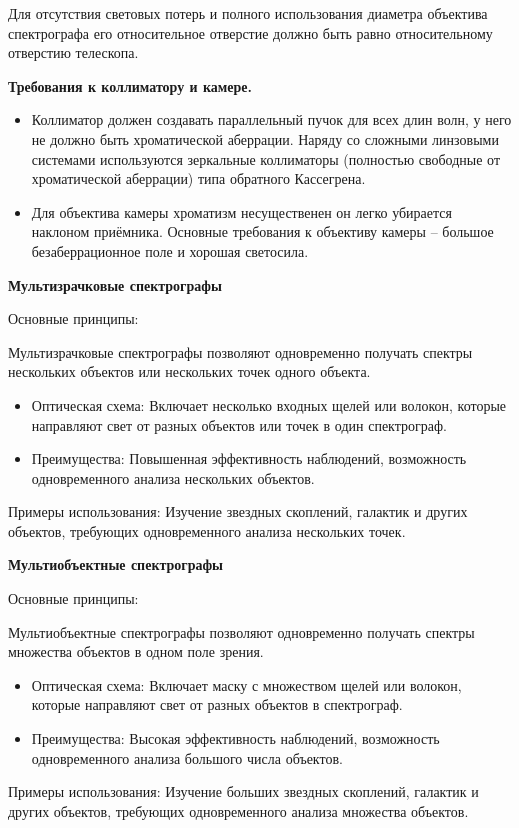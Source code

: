 \documentclass[12pt]{article}
\begin{document}
Для отсутствия световых потерь и полного использования диаметра
объектива спектрографа его относительное отверстие должно быть равно
относительному отверстию телескопа.

\textbf{Требования к коллиматору и камере.}
\begin{itemize}
\item Коллиматор должен создавать параллельный пучок для всех длин волн, у
него не должно быть хроматической аберрации.
Наряду со сложными линзовыми системами используются зеркальные
коллиматоры (полностью свободные от хроматической аберрации) типа
обратного Кассегрена.
\item Для объектива камеры хроматизм несущественен он легко убирается
наклоном приёмника. Основные требования к объективу камеры –
большое безаберрационное поле и хорошая светосила.
\end{itemize}



\textbf{Мультизрачковые спектрографы}

Основные принципы:

	Мультизрачковые спектрографы позволяют одновременно получать спектры нескольких объектов или нескольких точек одного объекта.
\begin{itemize}
\item Оптическая схема: Включает несколько входных щелей или волокон, которые направляют свет от разных объектов или точек в один спектрограф.
\item Преимущества: Повышенная эффективность наблюдений, возможность одновременного анализа нескольких объектов.
\end{itemize}
Примеры использования: Изучение звездных скоплений, галактик и других объектов, требующих одновременного анализа нескольких точек.

\textbf{Мультиобъектные спектрографы}

Основные принципы:

Мультиобъектные спектрографы позволяют одновременно получать спектры множества объектов в одном поле зрения.
\begin{itemize}
\item Оптическая схема: Включает маску с множеством щелей или волокон, которые направляют свет от разных объектов в спектрограф.
\item Преимущества: Высокая эффективность наблюдений, возможность одновременного анализа большого числа объектов.
\end{itemize}
Примеры использования: Изучение больших звездных скоплений, галактик и других объектов, требующих одновременного анализа множества объектов.
\end{document}
